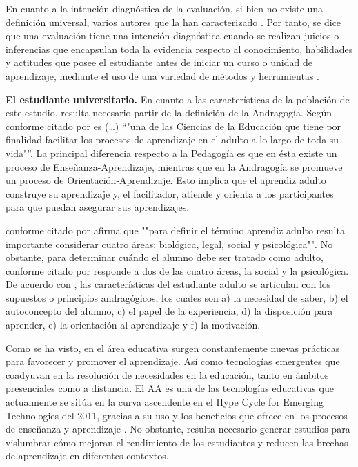 \documentclass[spanish]{textolivre}
\begin{document}
En cuanto a la intención diagnóstica de la evaluación, si bien no existe una definición universal, varios autores que la han caracterizado \cite{csapo2019}. Por tanto, se dice que una evaluación tiene una intención diagnóstica cuando se realizan juicios o inferencias que encapsulan toda la evidencia respecto al conocimiento, habilidades y actitudes que posee el estudiante antes de iniciar un curso o unidad de aprendizaje, mediante el uso de una variedad de métodos y herramientas \cite{javidanmehr2017,tangeokshim2017}.

\textbf{El estudiante universitario.} En cuanto a las características de la población de este estudio, resulta necesario partir de la definición de la Andragogía. Según \textcite{castro1990} conforme citado por \textcite[p.~69]{castillo2018} es (…) “"una de las Ciencias de la Educación que tiene por finalidad facilitar los procesos de aprendizaje en el adulto a lo largo de toda su vida"”. La principal diferencia respecto a la Pedagogía es que en ésta existe un proceso de Enseñanza-Aprendizaje, mientras que en la Andragogía se promueve un proceso de Orientación-Aprendizaje. Esto implica que el aprendiz adulto construye su aprendizaje y, el facilitador, atiende y orienta a los participantes para que puedan asegurar sus aprendizajes. 

\textcite{knowles2006} conforme citado por \textcite[p.~65]{castillo2018} afirma que ""para definir el término aprendiz adulto resulta importante considerar cuatro áreas: biológica, legal, social y psicológica"". No obstante, para determinar cuándo el alumno debe ser tratado como adulto, \textcite{knowles1980} conforme citado por \textcite{domenech2015} %
responde a dos de las cuatro áreas, la social y la psicológica. De acuerdo con \textcite{domenech2015}, las características del estudiante adulto se articulan con los supuestos o principios andragógicos, los cuales son a) la necesidad de saber, b) el autoconcepto del alumno, c) el papel de la experiencia, d) la disposición para aprender, e) la orientación al aprendizaje y f) la motivación. 

Como se ha visto, en el área educativa surgen constantemente nuevas prácticas para favorecer y promover el aprendizaje. Así como tecnologías emergentes que coadyuvan en la resolución de necesidades en la educación, tanto en ámbitos presenciales como a distancia. El AA es una de las tecnologías educativas que actualmente se sitúa en la curva ascendente en el Hype Cycle for Emerging Technologies del 2011, gracias a su uso y los beneficios que ofrece en los procesos de enseñanza y aprendizaje \cite{brown2020}. %
No obstante, resulta necesario generar estudios para vislumbrar cómo mejoran el rendimiento de los estudiantes y reducen las brechas de aprendizaje en diferentes contextos.
\end{document}
